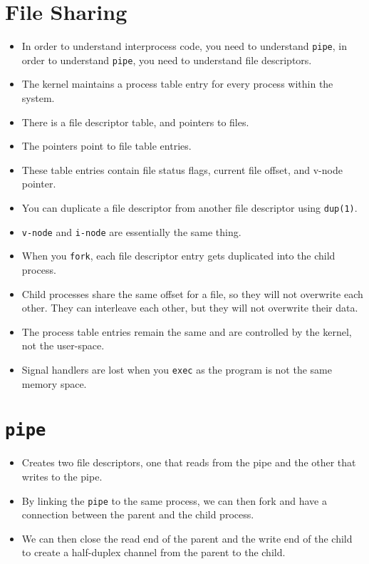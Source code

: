 \documentclass[]{article}
\newcommand{\code}{\texttt}
\begin{document}
\section{File Sharing}
\begin{itemize}
\item In order to understand interprocess code, you need to understand
\code{pipe}, in order to understand \code{pipe}, you need to understand file
descriptors.
\item The kernel maintains a process table entry for every process within the
system.
\item There is a file descriptor table, and pointers to files.
\item The pointers point to file table entries.
\item These table entries contain file status flags, current file offset, and
v-node pointer.
\item You can duplicate a file descriptor from another file descriptor using
\code{dup(1)}.
\item \code{v-node} and \code{i-node} are essentially the same thing.
\item When you \code{fork}, each file descriptor entry gets duplicated into the
child process.
\item Child processes share the same offset for a file, so they will not
overwrite each other. They can interleave each other, but they will not
overwrite their data.
\item The process table entries remain the same and are controlled by the
kernel, not the user-space.
\item Signal handlers are lost when you \code{exec} as the program is not the
same memory space.
\end{itemize}

\section{\code{pipe}}
\begin{itemize}
\item Creates two file descriptors, one that reads from the pipe and the other
that writes to the pipe.
\item By linking the \code{pipe} to the same process, we can then fork and have
a connection between the parent and the child process.
\item We can then close the read end of the parent and the write end of the
child to create a half-duplex channel from the parent to the child.
\end{itemize}
\end{document}
